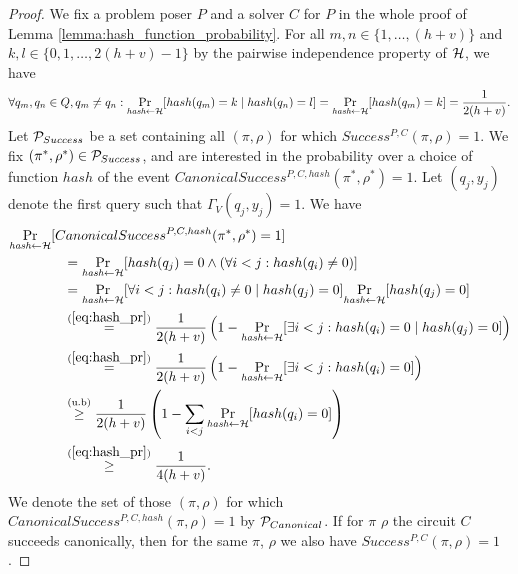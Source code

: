 \begin{proof}
We fix a problem poser $P$ and a solver $C$ for $P$ in the whole proof of Lemma \ref{lemma:hash_function_probability}.
For all $m,n \in \{1, \dots, (h+v)\}$ and $k,l \in \{0,1,\dots,2(h+v)-1\}$ by the pairwise independence property of $\mathcal{H}$, we have
\begin{align}
  \label{eq:hash_pr}
 \forall q_m,q_n \in Q, q_m \neq q_n : \underset{\textit{hash} \leftarrow \mathcal{H}}{\Pr}[hash(q_m) = k \mid hash(q_n) = l] =
 \underset{\textit{hash} \leftarrow \mathcal{H}}{\Pr}[hash(q_m) = k] = \frac{1}{2(h+v)}.
\end{align}
%
Let $\mathcal{P}_{Success}$ be a set containing all $(\pi,\rho)$ for which $Success^{P, C}(\pi, \rho) = 1$.
We fix $(\pi^*, \rho^*) \in \mathcal{P}_{Success}$, and are interested in the probability over
a choice of function $hash$ of the event $CanonicalSuccess^{P,C,hash}(\pi^*, \rho^*) = 1$.
Let $(q_j, y_j)$ denote the first query such that $\Gamma_V(q_j, y_j) = 1$.
We have
\begin{align}
  \label{ineq:prob_hash_success}
  &\underset{\textit{hash} \leftarrow \mathcal{H}}{\Pr}[CanonicalSuccess^{P,C,hash}(\pi^*, \rho^*) = 1] \notag\\
  &\mbox\qquad\qquad = \underset{\textit{hash} \leftarrow \mathcal{H}}{\Pr}[hash(q_j) = 0 \land (\forall i < j : hash(q_i) \neq 0)] \notag\\
  &\mbox\qquad\qquad = \underset{\textit{hash} \leftarrow \mathcal{H}}{\Pr}[\forall i < j : hash(q_i) \neq 0 \mid hash(q_j) = 0] \underset{\textit{hash} \leftarrow \mathcal{H}}{\Pr}[hash(q_j) = 0] \notag\\
  &\mbox\qquad\qquad \stackrel{(\ref{eq:hash_pr})}{=} \frac{1}{2(h+v)}\left(1 -\underset{\textit{hash} \leftarrow \mathcal{H}}{\Pr}[\exists i < j : hash(q_i) = 0 \mid hash(q_j) = 0] \right) \notag\\
  &\mbox\qquad\qquad \stackrel{(\ref{eq:hash_pr})}{=} \frac{1}{2(h+v)} \left( 1 -\underset{\textit{hash} \leftarrow \mathcal{H}}{\Pr}[\exists i < j : hash(q_i) = 0] \right) \notag\\
  &\mbox\qquad\qquad \stackrel{(\text{u.b})}{\geq} \frac{1}{2(h+v)} \left( 1 - \sum_{i < j} \underset{\textit{hash} \leftarrow \mathcal{H}}{\Pr}[hash(q_i) = 0] \right) \notag\\
  &\mbox\qquad\qquad \stackrel{(\ref{eq:hash_pr})}{\geq} \frac{1}{4(h+v)}.
\end{align}
%
We denote the set of those $(\pi,\rho)$ for which $CanonicalSuccess^{P, C, hash}(\pi, \rho) = 1$ by $\mathcal{P}_{Canonical}$.
If for $\pi$ $\rho$ the circuit $C$ succeeds canonically, then for the same $\pi$, $\rho$ we also have $Success^{P, C}(\pi, \rho) = 1$.

\end{proof}
